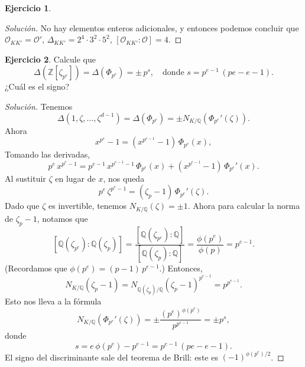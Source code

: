 \documentclass{article}
\newcounter{tarea}
\theoremstyle{definition}
\newtheorem{ejercicio}{Ejercicio}[tarea]
\newenvironment{solucion}{\begin{proof}[Solución]}{\end{proof}}
\newcommand{\ZZ}{\mathbb{Z}}
\newcommand{\QQ}{\mathbb{Q}}
\renewcommand{\O}{\mathcal{O}}
\begin{document}
\begin{ejercicio}
\begin{solucion}
    No hay elementos enteros adicionales, y entonces podemos concluir que
    $\O_{KK'} = \O'$, $\Delta_{KK'} = 2^4\cdot 3^2\cdot 5^2$,
    $[\O_{KK'} : \O] = 4$.
  \end{solucion}
  \fi
\end{ejercicio}

\begin{ejercicio}
  Calcule que
  \[ \Delta (\ZZ [\zeta_{p^e}]) = \Delta (\Phi_{p^e}) = \pm\,p^s,
     \quad \text{donde } s = p^{e-1}\,(pe - e - 1). \]
  ¿Cuál es el signo?

  \ifdefined\solutions
  \begin{solucion}
    Tenemos
  \[ \Delta (1, \zeta, \ldots, \zeta^{d-1}) = \Delta (\Phi_{p^e})
     = \pm N_{K/\QQ} (\Phi_{p^e}' (\zeta)). \]
  Ahora
  $$x^{p^e} - 1 = (x^{p^{e-1}} - 1)\,\Phi_{p^e} (x),$$
  Tomando las derivadas,
  $$p^e\,x^{p^e-1} = p^{e-1}\,x^{p^{e-1}-1}\,\Phi_{p^e} (x) + (x^{p^{e-1}} - 1)\,\Phi_{p^e}' (x).$$
  Al sustituir $\zeta$ en lugar de $x$, nos queda
  $$p^e\,\zeta^{p^e-1} = (\zeta_p - 1)\,\Phi_{p^e}' (\zeta).$$
  Dado que $\zeta$ es invertible, tenemos $N_{K/\QQ} (\zeta) = \pm 1$.
  Ahora para calcular la norma de $\zeta_p - 1$, notamos que
  \[ [\QQ (\zeta_{p^e}) : \QQ (\zeta_p)] =
     \frac{[\QQ (\zeta_{p^e}) : \QQ]}{[\QQ (\zeta_p) : \QQ]} =
     \frac{\phi (p^e)}{\phi (p)} = p^{e-1}. \]
  (Recordamos que $\phi (p^e) = (p-1)\,p^{e-1}$.) Entonces,
  \[ N_{K/\QQ} (\zeta_p - 1) =
     N_{\QQ (\zeta_p)/\QQ} (\zeta_p - 1)^{p^{e-1}} = p^{p^{e-1}}. \]
  Esto nos lleva a la fórmula
  $$N_{K/\QQ} (\Phi_{p^e}' (\zeta)) = \pm \frac{(p^e)^{\phi (p^e)}}{p^{p^{e-1}}} = \pm p^s,$$
  donde
  $$s = e\,\phi (p^e) - p^{e-1} = p^{e-1} \, (pe- e - 1).$$
  El signo del discriminante sale del teorema de Brill: este es
  $(-1)^{\phi (p^e)/2}$.
  \end{solucion}
  \fi
\end{ejercicio}
\end{document}
